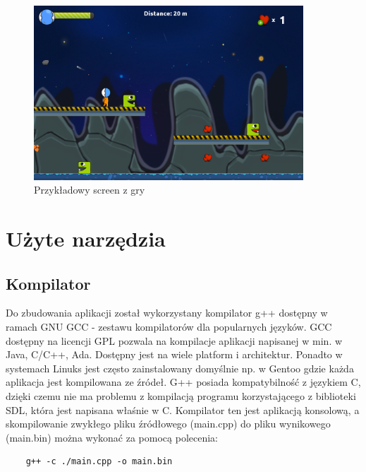 \begin{figure}[h]
    \centering
    \includegraphics[width=0.9\textwidth,natwidth=525,natheight=142]{./Pictures/gra1.png}
    \caption{Przykładowy screen z gry}
\end{figure}

\section{Użyte narzędzia}
\subsection{Kompilator}
\hspace{1cm} Do zbudowania aplikacji został wykorzystany kompilator g++ dostępny w ramach GNU GCC - zestawu kompilatorów dla popularnych języków. GCC dostępny na licencji GPL pozwala na kompilacje aplikacji napisanej w min. w Java, C/C++, Ada. Dostępny jest na wiele platform i architektur. Ponadto w systemach Linuks jest często zainstalowany domyślnie np. w Gentoo gdzie każda aplikacja jest kompilowana ze źródeł. G++ posiada kompatybilność z językiem C, dzięki czemu nie ma problemu z kompilacją programu korzystającego z biblioteki SDL, która jest napisana właśnie w C. Kompilator ten jest aplikacją konsolową, a skompilowanie zwykłego pliku źródłowego (main.cpp) do pliku wynikowego (main.bin) można wykonać za pomocą polecenia:
\begin{verbatim}
	g++ -c ./main.cpp -o main.bin
\end{verbatim}

